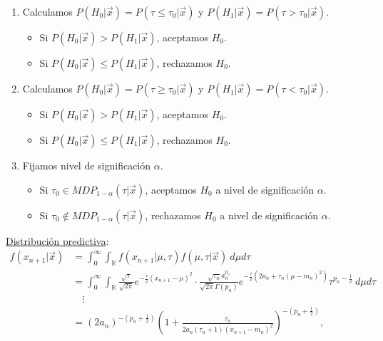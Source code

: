 \begin{enumerate}
    \item Calculamos $P(H_0 | \vec{x}) = P(\tau\leq \tau_0 |\vec{x})$ y $P(H_1 | \vec{x}) = P(\tau> \tau_0 | \vec{x})$.
          \begin{itemize}
              \item Si $P(H_0 | \vec{x}) > P(H_1 | \vec{x})$, aceptamos $H_0$.
              \item Si $P(H_0 | \vec{x}) \leq P(H_1 | \vec{x})$, rechazamos $H_0$.
          \end{itemize}
    \item Calculamos $P(H_0 | \vec{x}) = P(\tau \ge \tau_0 |\vec{x})$ y $P(H_1 | \vec{x}) = P(\tau< \tau_0 | \vec{x})$.
          \begin{itemize}
              \item Si $P(H_0 | \vec{x}) > P(H_1 | \vec{x})$, aceptamos $H_0$.
              \item Si $P(H_0 | \vec{x}) \leq P(H_1 | \vec{x})$, rechazamos $H_0$.
          \end{itemize}
    \item Fijamos nivel de significación $\alpha$.
          \begin{itemize}
              \item Si $\tau_0 \in MDP_{1 - \alpha}(\tau | \vec{x})$, aceptamos $H_0$ a nivel de significación $\alpha$.
              \item Si $\tau_0 \not\in MDP_{1 - \alpha}(\tau| \vec{x})$, rechazamos $H_0$ a nivel de significación $\alpha$.
          \end{itemize}
\end{enumerate}

\underline{Distribución predictiva}:
\begin{align*}
    f(x_{n+1} | \vec{x}) & = \int_{0}^{\infty} \int_{\mathbb{R}} f(x_{n+1} | \mu, \tau) f(\mu,\tau | \vec{x}) \ d\mu d\tau                                                                                                                                                         \\
                         & = \int_{0}^{\infty} \int_{\mathbb{R}} \frac{\sqrt{\tau}}{\sqrt{2\pi}}e^{-\frac{\tau}{2}(x_{n+1} -\mu)^2} \cdot \frac{\sqrt{\tau_n}a_n^{p_n}}{\sqrt{2\pi}\Gamma(p_n)}e^{-\frac{\tau}{2}(2a_n + \tau_n(\mu-m_n)^2)} \tau^{p_n - \frac{1}{2}} \ d\mu d\tau \\
                         & \quad \vdots                                                                                                                                                                                                                                            \\
                         & = (2a_n)^{-\left(p_n + \frac{1}{2} \right)}\left( 1 + \frac{\tau_n}{2a_n(\tau_n+1)(x_{n+1} - m_n)^2}\right)^{-\left(p_n + \frac{1}{2} \right)},
\end{align*}

